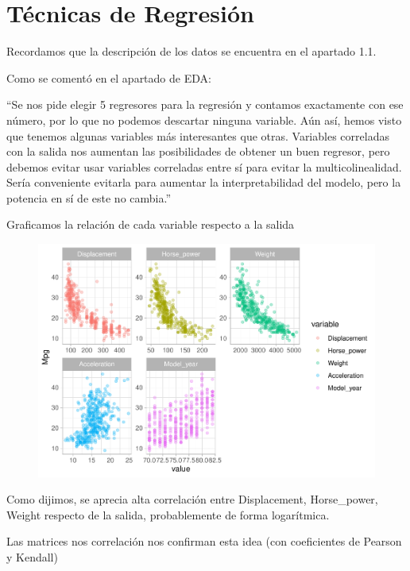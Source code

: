 \section{Técnicas de Regresión}

Recordamos que la descripción de los datos se encuentra en el apartado 1.1.

Como se comentó en el apartado de EDA:

``Se nos pide elegir 5 regresores para la regresión y contamos exactamente con ese número, por lo que no podemos descartar ninguna variable. Aún así, hemos visto que tenemos algunas variables más interesantes que otras. Variables correladas con la salida nos aumentan las posibilidades de obtener un buen regresor, pero debemos evitar usar variables correladas entre sí para evitar la multicolinealidad. Sería conveniente evitarla para aumentar la interpretabilidad del modelo, pero la potencia en sí de este no cambia.''

Graficamos la relación de cada variable respecto a la salida

\begin{figure}[H]\includegraphics[width=.9\linewidth]{img/Regresion_files/figure-latex/unnamed-chunk-2-1} \caption{}\end{figure}

Como dijimos, se aprecia alta correlación entre Displacement, Horse\_power, Weight respecto de la salida, probablemente de forma logarítmica.

Las matrices nos correlación nos confirman esta idea (con coeficientes de Pearson y Kendall)

